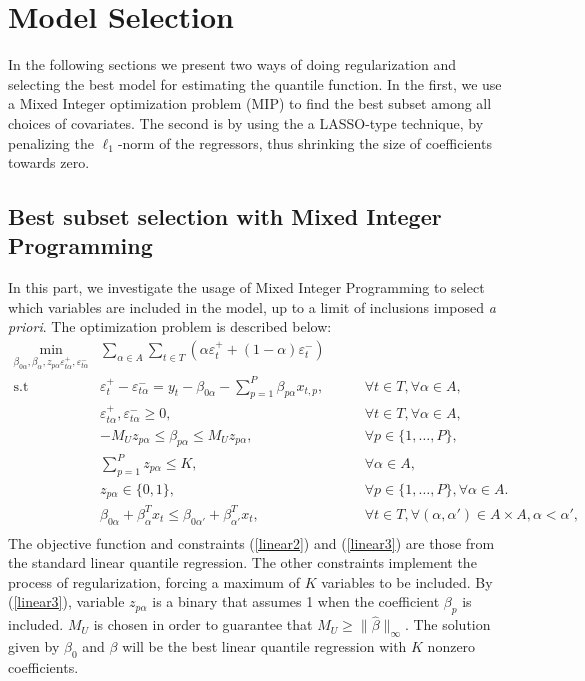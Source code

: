 \section{Model Selection}

In the following sections we present two ways of doing regularization and selecting the best model for estimating the quantile function. In the first, we use a Mixed Integer optimization problem (MIP) to find the best subset among all choices of covariates. The second is by using the a LASSO-type technique, by penalizing the $\ell_1$-norm of the regressors, thus shrinking the size of coefficients towards zero.  

\subsection{Best subset selection with Mixed Integer Programming}
\label{sec:best-subset-mip}

In this part, we investigate the usage of Mixed Integer Programming to select which variables are included in the model, up to a limit of inclusions imposed \textit{a priori}. The optimization problem is described below:
\begin{eqnarray}
 \underset{\beta_{0\alpha},\beta_\alpha,z_{p \alpha} \varepsilon_{t \alpha}^{+},\varepsilon_{t \alpha}^{-}}{\text{min}} & \sum_{\alpha \in A} \sum_{t\in T}\left(\alpha\varepsilon_{t}^{+}+(1-\alpha)\varepsilon_{t}^{-}\right) \\
\mbox{s.t } & \varepsilon_{t}^{+}-\varepsilon_{t \alpha}^{-}=y_{t}-\beta_{0 \alpha}-\sum_{p=1}^{P}\beta_{p \alpha}x_{t,p},& \qquad\forall t \in T ,\forall \alpha \in A, \label{linear1}\\
& \varepsilon_{t \alpha}^{+},\varepsilon_{t \alpha}^{-}\geq0,&\qquad\forall t \in T ,\forall \alpha \in A, \label{linear2}\\
& - M_U z_{p \alpha} \leq \beta_{p \alpha} \leq M_U z_{p \alpha},&\qquad\forall p\in\{1,\dots,P\}, \label{linear3}\\
& \sum_{p=1}^P z_{p \alpha} \leq K, & \qquad \forall \alpha \in A, \label{linear4}\\
& z_{p \alpha} \in \{0,1\},&\qquad\forall p\in\{1,\dots,P\}, \forall \alpha \in A. \label{eq:linear5}\\
& \beta_{0\alpha} + \beta_{\alpha}^T x_{t} \leq \beta_{0\alpha'} + \beta_{\alpha'}^T x_{t}, & \qquad \forall t \in T, \forall (\alpha, \alpha') \in A \times A,  \alpha < \alpha',\nonumber\\ 
\end{eqnarray}
The objective function and constraints (\ref{linear2}) and (\ref{linear3}) are those from the standard linear quantile regression. The other constraints implement the process of regularization, forcing a maximum of $K$ variables to be included. By (\ref{linear3}), variable $z_{p \alpha}$ is a binary that assumes 1 when the coefficient $\beta_p$ is included. $M_U$ is chosen in order to guarantee that $M_U \geq \|\hat{\beta}\|_{\infty}$. The solution given by $\beta_0$ and $\beta$ will be the best linear quantile regression with $K$ nonzero coefficients. 

